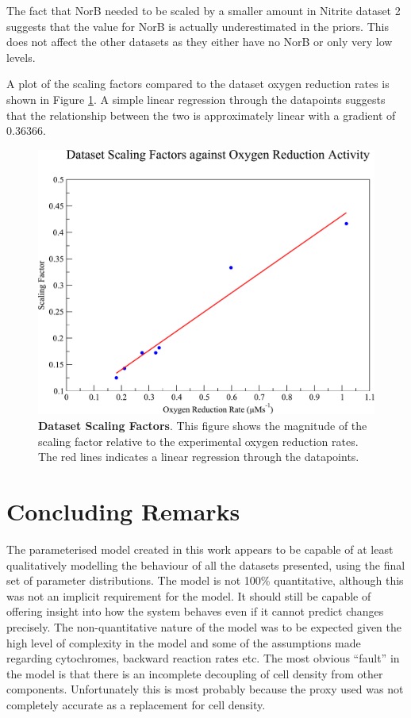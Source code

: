 The fact that NorB needed to be scaled by a smaller amount in Nitrite dataset 2 suggests that the value for NorB is actually underestimated in the priors. This does not affect the other datasets as they either have no NorB or only very low levels.

A plot of the scaling factors compared to the dataset oxygen reduction rates is shown in Figure \ref{fig:scaling-factors}. A simple linear regression through the datapoints suggests that the relationship between the two is approximately linear with a gradient of $0.36366$.

\begin{figure}[tbp]
 \centering
 \includegraphics[width=15cm, clip=true]{./09-completedmodel/data/scaling.pdf}
 \caption[Dataset Scaling Factors]{{\bf Dataset Scaling Factors}. This figure shows the magnitude of the scaling factor relative to the experimental oxygen reduction rates. The red lines indicates a linear regression through the datapoints.
 \label{fig:scaling-factors}}
\end{figure}

\section{Concluding Remarks}
The parameterised model created in this work appears to be capable of at least qualitatively modelling the behaviour of all the datasets presented, using the final set of parameter distributions. The model is not 100\% quantitative, although this was not an implicit requirement for the model. It should still be capable of offering insight into how the system behaves even if it cannot predict changes precisely. The non-quantitative nature of the model was to be expected given the high level of complexity in the model and some of the assumptions made regarding cytochromes, backward reaction rates etc. The most obvious ``fault'' in the model is that there is an incomplete decoupling of cell density from other components. Unfortunately this is most probably because the proxy used was not completely accurate as a replacement for cell density.

